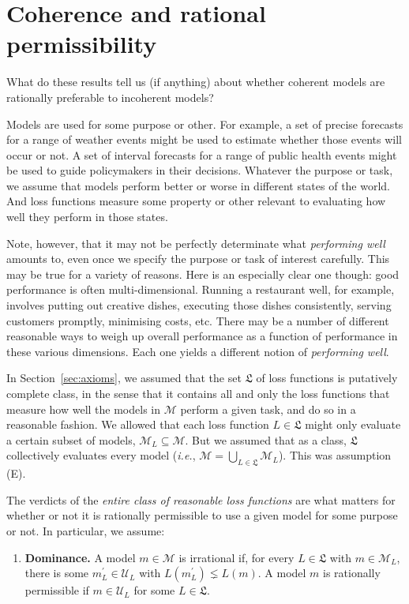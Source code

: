 \documentclass[11pt]{article}
\theoremstyle{definition}
\theoremstyle{remark}
\newcommand{\M}{\mathcal M}
\newcommand{\U}{\mathcal U}
\begin{document}
\section{Coherence and rational permissibility}\label{sec:argument}

What do these results tell us (if anything) about whether coherent models are rationally preferable to incoherent models?

Models are used for some purpose or other. For example, a set of precise forecasts for a range of weather events might be used to estimate whether those events will occur or not. A set of interval forecasts for a range of public health events might be used to guide policymakers in their decisions. Whatever the purpose or task, we assume that models perform better or worse in different states of the world. And loss functions measure some property or other relevant to evaluating how well they perform in those states. 

Note, however, that it may not be perfectly determinate what \textit{performing well} amounts to, even once we specify the purpose or task of interest carefully. This may be true for a variety of reasons. Here is an especially clear one though: good performance is often multi-dimensional. Running a restaurant well, for example, involves putting out creative dishes, executing those dishes consistently, serving customers promptly, minimising costs, etc. There may be a number of different reasonable ways to weigh up overall performance as a function of performance in these various dimensions. Each one yields a different notion of \textit{performing well}.

In Section~\ref{sec:axioms}, we assumed that the set $\mathfrak L$ of loss functions is putatively complete class, in the sense that it contains all and only the loss functions that measure how well the models in $\M$ perform a given task, and do so in a reasonable fashion. We allowed that each loss function $L\in\mathfrak L$ might only evaluate a certain subset of models, $\M_L\subseteq\M$. But we assumed that as a class, $\mathfrak L$ collectively evaluates every model (\textit{i.e.}, $\M=\bigcup_{L\in\mathfrak L}\M_L$). This was assumption (E).




The verdicts of the \textit{entire class of reasonable loss functions} are what matters for whether or not it is rationally permissible to use a given model for some purpose or not. In particular, we assume:


\begin{enumerate}[label=\textbf{(D)},leftmargin=*]
\item \textbf{Dominance.} A model $m\in\M$ is irrational if, for every $L\in\mathfrak L$ with $m\in\M_L$, there is some $m_L^\prime\in\U_L$ with $L(m_L^\prime)\lneq L(m)$. A model $m$ is rationally permissible if $m\in\U_L$ for some $L\in\mathfrak L$.
\end{enumerate}
\end{document}
